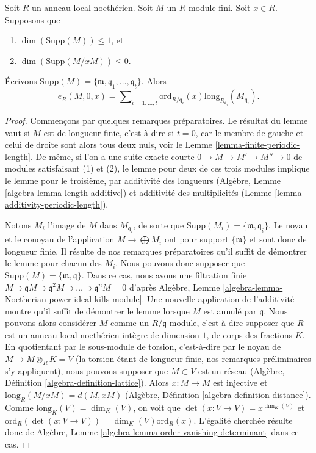 \begin{lemma}
\label{lemma-length-multiplication}
Soit $R$ un anneau local noethérien.
Soit $M$ un $R$-module fini. Soit $x \in R$. Supposons que
\begin{enumerate}
\item $\dim(\text{Supp}(M)) \leq 1$, et
\item $\dim(\text{Supp}(M/xM)) \leq 0$.
\end{enumerate}
Écrivons
$\text{Supp}(M) = \{\mathfrak m, \mathfrak q_1, \ldots, \mathfrak q_t\}$.
Alors
$$
e_R(M, 0, x) =
\sum\nolimits_{i = 1, \ldots, t}
\text{ord}_{R/\mathfrak q_i}(x)
\text{long}_{R_{\mathfrak q_i}}(M_{\mathfrak q_i}).
$$
\end{lemma}

\begin{proof}
Commençons par quelques remarques préparatoires.
Le résultat du lemme vaut si $M$ est de longueur finie, c'est-à-dire si $t = 0$,
car le membre de gauche et celui de droite sont alors tous deux nuls,
voir le Lemme \ref{lemma-finite-periodic-length}.
De même, si l'on a une suite exacte courte $0 \to M \to M' \to M'' \to 0$
de modules satisfaisant (1) et (2), le lemme pour deux de ces trois
modules implique le lemme pour le troisième, par
additivité des longueurs (Algèbre, Lemme \ref{algebra-lemma-length-additive}) et
additivité des multiplicités (Lemme \ref{lemma-additivity-periodic-length}).

\medskip\noindent
Notons $M_i$ l'image de $M$ dans $M_{\mathfrak q_i}$, de sorte que
$\text{Supp}(M_i) = \{\mathfrak m, \mathfrak q_i\}$.
Le noyau et le conoyau de l'application $M \to \bigoplus M_i$
ont pour support $\{\mathfrak m\}$ et sont donc de longueur finie.
Il résulte de nos remarques préparatoires qu'il suffit de
démontrer le lemme pour chacun des $M_i$. Nous pouvons donc supposer que
$\text{Supp}(M) = \{\mathfrak m, \mathfrak q\}$.
Dans ce cas, nous avons une filtration finie
$M \supset \mathfrak qM \supset \mathfrak q^2M \supset \ldots \supset
\mathfrak q^nM = 0$ d'après Algèbre, Lemme
\ref{algebra-lemma-Noetherian-power-ideal-kills-module}.
Une nouvelle application de l'additivité montre qu'il suffit de démontrer le lemme
lorsque $M$ est annulé par $\mathfrak q$.
Nous pouvons alors considérer $M$ comme un $R/\mathfrak q$-module,
c'est-à-dire supposer que $R$ est un anneau local noethérien intègre
de dimension $1$, de corps des fractions $K$.
En quotientant par le sous-module de torsion, c'est-à-dire par le
noyau de $M \to M \otimes_R K = V$ (la torsion étant de
longueur finie, nos remarques préliminaires s'y appliquent),
nous pouvons supposer que $M \subset V$ est un réseau
(Algèbre, Définition \ref{algebra-definition-lattice}).
Alors $x : M \to M$ est injective et
$\text{long}_R(M/xM) = d(M, xM)$
(Algèbre, Définition \ref{algebra-definition-distance}). Comme
$\text{long}_K(V) = \dim_K(V)$,
on voit que $\det(x : V \to V) = x^{\dim_K(V)}$ et
$\text{ord}_R(\det(x : V \to V)) = \dim_K(V) \text{ord}_R(x)$.
L'égalité cherchée résulte donc de
Algèbre, Lemme \ref{algebra-lemma-order-vanishing-determinant}
dans ce cas.
\end{proof}

